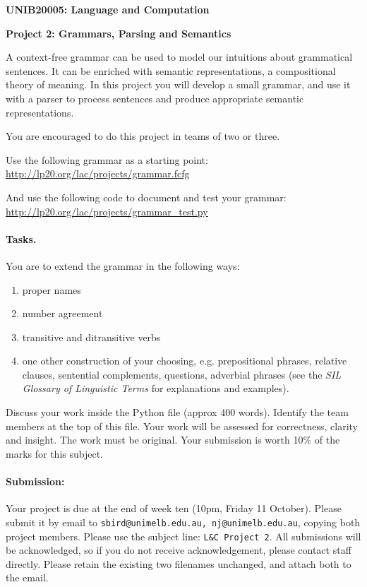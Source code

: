\documentclass[a4paper,10pt]{article}
\begin{document}
\centerline{\LARGE\bf UNIB20005: Language and Computation}\vspace{2ex}

\centerline{\large\bf Project 2: Grammars, Parsing and Semantics}\vspace{2ex}

A context-free grammar can be used to model our intuitions about grammatical sentences.
It can be enriched with semantic representations, a compositional theory of meaning.
In this project you will develop a small grammar, and use it with a parser to
process sentences and produce appropriate semantic representations.

You are encouraged to do this project in teams of two or three.

Use the following grammar as a starting point:\\
\url{http://lp20.org/lac/projects/grammar.fcfg}

And use the following code to document and test your grammar:\\
\url{http://lp20.org/lac/projects/grammar_test.py}

\paragraph{Tasks.}
You are to extend the grammar in the following ways:

\begin{enumerate}
\item proper names
\item number agreement
\item transitive and ditransitive verbs
\item one other construction of your choosing, e.g. prepositional phrases, relative clauses, sentential complements, questions, adverbial phrases (see the \emph{SIL Glossary of Linguistic Terms} for explanations
and examples).
\end{enumerate}

Discuss your work inside the Python file (approx 400 words).
Identify the team members at the top of this file.
Your work will be assessed for correctness, clarity and insight. 
The work must be original.
Your submission is worth 10\% of the marks for this subject.

\paragraph{Submission:}
Your project is due at the end of week ten (10pm, Friday 11 October). Please submit it by email to
\texttt{sbird@unimelb.edu.au, nj@unimelb.edu.au}, copying both project members. Please use the subject line: \texttt{L\&C Project 2}.
All submissions will be acknowledged, so if you do not receive acknowledgement, please contact staff directly.
Please retain the existing two filenames unchanged, and attach both to the email.
\end{document}

